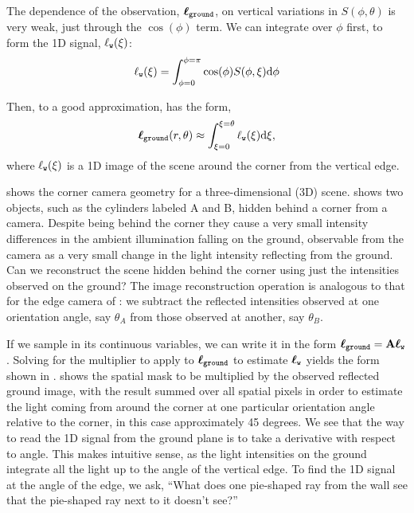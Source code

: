 The dependence of the observation, $\boldsymbol\ell_{\texttt{ground}}$, on vertical variations in
$S(\phi, \theta)$ is very weak, just through the $\cos(\phi)$ term.
We can integrate over $\phi$ first, to form the 1D signal,
$\ell_{\texttt{w}} (\xi)$:
\begin{equation}
  \ell_{\texttt{w}} (\xi) = \int_{\phi=0}^{\phi=\pi} 
  \cos(\phi) S(\phi, \xi) \mbox{d} \phi 
\label{eq:xcorner}
\end{equation}

Then, to a good approximation, \eqn{\ref{eq:corner}} has the form,
\begin{equation}
 \boldsymbol\ell_{\texttt{ground}} (r, \theta) \approx \int_{\xi=0}^{\xi=\theta}
 \ell_{\texttt{w}} (\xi) \mbox{d} \xi,
\label{eq:corner1d}
\end{equation}
where $\ell_{\texttt{w}} (\xi)$ is a 1D image of the scene around the corner from the vertical edge.

\Fig{\ref{fig:ccmodel}} shows the corner camera geometry for a three-dimensional (3D) scene.   shows two objects, such as the cylinders labeled A and B, hidden behind a corner from a camera. Despite being behind the corner they cause a very small intensity differences in the ambient illumination falling on the ground, observable from the camera as a very small change in the light intensity reflecting from the ground. Can we reconstruct the scene hidden behind the corner using just the intensities observed on the ground? The image reconstruction operation is analogous to that for the edge camera of \fig{\ref{fig:amats3}}:  we subtract the reflected intensities observed at one orientation angle, say $\theta_A$ from those observed at another, say $\theta_B$. 

If we sample \eqn{\ref{eq:corner1d}} in its continuous variables, we
can write it in the form $\boldsymbol\ell_{\texttt{ground}} = \mathbf{A} \boldsymbol\ell_{\texttt{w}}$.  Solving \eqn{\ref{eq:deriv2}}
for the multiplier to apply to $\boldsymbol\ell_{\texttt{ground}}$ to estimate $\boldsymbol\ell_{\texttt{w}}$ yields the form shown in
.   shows the spatial mask to be multiplied by the observed reflected ground image, with the result summed over all spatial pixels in order to estimate the light coming from around the corner at one particular orientation angle relative to the corner, in this case approximately 45 degrees. We see that the way to read the 1D signal from the ground plane is to take a derivative with respect to angle.  This makes intuitive sense, as the light intensities on the ground integrate all the light up to the angle of the vertical edge.  To find the 1D signal at the angle of the edge, we ask, ``What does one pie-shaped ray from the wall see that the pie-shaped ray next to it doesn't see?''


